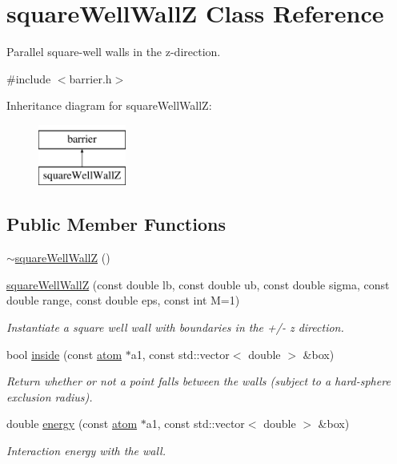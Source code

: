\hypertarget{classsquare_well_wall_z}{\section{square\-Well\-Wall\-Z Class Reference}
\label{classsquare_well_wall_z}
}


Parallel square-\/well walls in the z-\/direction.  




{\ttfamily \#include $<$barrier.\-h$>$}

Inheritance diagram for square\-Well\-Wall\-Z\-:\begin{figure}[H]
\begin{center}
\leavevmode
\includegraphics[height=2.000000cm]{classsquare_well_wall_z}
\end{center}
\end{figure}
\subsection*{Public Member Functions}
\begin{DoxyCompactItemize}
\item 
\hyperlink{classsquare_well_wall_z_a98e2785289630c78afcb0bc8a7fd24e1}{$\sim$square\-Well\-Wall\-Z} ()
\item 
\hyperlink{classsquare_well_wall_z_a9f4c4e2e118fd68c2591a4d6f06aa594}{square\-Well\-Wall\-Z} (const double lb, const double ub, const double sigma, const double range, const double eps, const int M=1)
\begin{DoxyCompactList}\small\item\em Instantiate a square well wall with boundaries in the +/-\/ z direction. \end{DoxyCompactList}\item 
bool \hyperlink{classsquare_well_wall_z_a10fc7a357ac1ec6bb0cd1d1e95570195}{inside} (const \hyperlink{classatom}{atom} $\ast$a1, const std\-::vector$<$ double $>$ \&box)
\begin{DoxyCompactList}\small\item\em Return whether or not a point falls between the walls (subject to a hard-\/sphere exclusion radius). \end{DoxyCompactList}\item 
double \hyperlink{classsquare_well_wall_z_a77c366eb9c10f6a68e3f633e9b64dc47}{energy} (const \hyperlink{classatom}{atom} $\ast$a1, const std\-::vector$<$ double $>$ \&box)
\begin{DoxyCompactList}\small\item\em Interaction energy with the wall. \end{DoxyCompactList}\end{DoxyCompactItemize}
